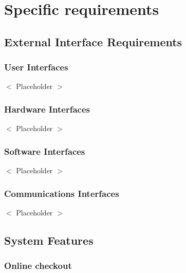 \documentclass{scrreprt}
\theoremstyle{funreq}
\begin{document}
{\let\clearpage\relax 
\chapter{Specific requirements}}

\section{External Interface Requirements}

\subsection{User Interfaces}
$<$ Placeholder $>$

\subsection{Hardware Interfaces}
$<$ Placeholder $>$

\subsection{Software Interfaces}
$<$ Placeholder $>$

\subsection{Communications Interfaces}
$<$ Placeholder $>$

\section{System Features}



\subsection{Online checkout}
\end{document}
